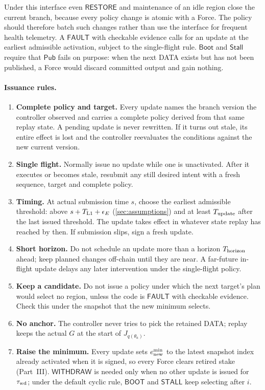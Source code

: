 \documentclass[11pt,a4paper]{article}
\newcommand{\tagg}[1]{\ensuremath{\mathsf{#1}}}
\begin{document}
Under this interface even \tagg{RESTORE} and maintenance of an idle
region close the current branch, because every policy change is atomic with
a Force. The policy should therefore batch such changes rather than use
the interface for frequent health telemetry. A \tagg{FAULT} with
checkable evidence calls for an update at the earliest admissible
activation, subject to the single-flight rule. $\tagg{Boot}$ and
$\tagg{Stall}$ require that $\tagg{Pub}$ fails on purpose: when the next
DATA exists but has not been published, a Force would discard committed
output and gain nothing.

\paragraph{Issuance rules.}
\begin{enumerate}[label=(R\arabic*)]
\item \textbf{Complete policy and target.} Every update names the branch
version the controller observed and carries a complete policy derived from
that same replay state. A pending update is never rewritten. If it turns
out stale, its entire effect is lost and the controller reevaluates the
conditions against the new current version.
\item \textbf{Single flight.} Normally issue no update while one is
unactivated. After it executes or becomes stale, resubmit any still
desired intent with a fresh sequence, target and complete policy.
\item \textbf{Timing.} At actual submission time $s$, choose the
earliest admissible threshold: above $s+T_{\rm L1}+\epsilon_E$
(\cref{sec:assumptions}) and at least $T_{\rm update}$ after the last
issued threshold. The update takes effect in whatever state replay has
reached by then. If submission slips, sign a fresh update.
\item \textbf{Short horizon.} Do not schedule an update more than a
horizon $T_{\rm horizon}$ ahead; keep planned changes off-chain until they are near.
A far-future in-flight update delays any later intervention under the
single-flight policy.
\item \textbf{Keep a candidate.} Do not issue a policy under which the
next target's plan would select no region, unless the code is
\tagg{FAULT} with checkable evidence. Check this under the snapshot that
the new minimum selects.
\item \textbf{No anchor.} The controller never tries to pick the
retained DATA; replay keeps the actual $G$ at the start of
$J_{q(\theta_a)}$.
\item \textbf{Raise the minimum.} Every update sets $e^{\min}_{\rm new}$
to the latest snapshot index already activated when it is signed, so
every Force clears retired stake (Part~III). \tagg{WITHDRAW} is needed
only when no other update is issued for $\tau_{\rm wd}$; under the default
cyclic rule, \tagg{BOOT} and \tagg{STALL} keep selecting after $i$.
\end{enumerate}
\end{document}
